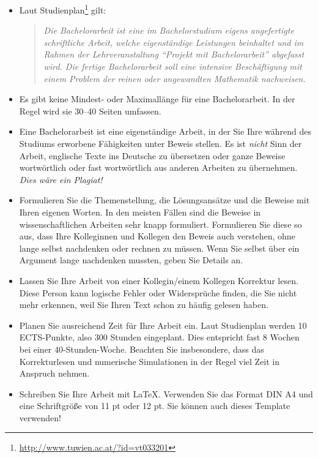 \documentclass[a4paper,11pt,bibliography=totoc,listof=totoc,headinclude=true,cleardoublepage=empty,oneside]{scrbook}
\begin{document}
{\color{change}
\begin{itemize}

\item Laut Studienplan\footnote{\href{http://www.tuwien.ac.at/?id=vt033201}{\ttfamily http://www.tuwien.ac.at/?id=vt033201}}
gilt:
\begin{quote}\itshape
Die Bachelorarbeit ist eine im Bachelorstudium eigens angefertigte schriftliche Arbeit, welche eigenständige Leistungen beinhaltet und im Rahmen der Lehrveranstaltung "`Projekt mit Bachelorarbeit"' abgefasst wird. Die fertige Bachelorarbeit soll eine intensive Beschäftigung mit einem Problem der reinen oder angewandten Mathematik nachweisen.
\end{quote}

\item Es gibt keine Mindest- oder Maximallänge für eine Bachelorarbeit. In der Regel wird sie 30--40 Seiten umfassen.

\item Eine Bachelorarbeit ist eine eigenständige Arbeit, in der Sie Ihre während
des Studiums erworbene Fähigkeiten unter Beweis stellen. Es ist {\em nicht}
Sinn der Arbeit, englische Texte ins Deutsche zu übersetzen oder ganze
Beweise wortwörtlich oder fast wortwörtlich 
aus anderen Arbeiten zu übernehmen. {\em Dies wäre ein Plagiat!} 

\item Formulieren Sie die Themenstellung, die Lösungsansätze und die Beweise 
mit Ihren eigenen Worten. In den meisten Fällen sind die Beweise
in wissenschaftlichen Arbeiten sehr knapp formuliert. Formulieren Sie diese so
aus, dass Ihre Kolleginnen und Kollegen den Beweis auch verstehen, ohne lange selbst nachdenken
oder rechnen zu müssen. Wenn Sie selbst über ein Argument lange nachdenken mussten,
geben Sie Details an.

\item Lassen Sie Ihre Arbeit von einer Kollegin/einem Kollegen Korrektur lesen.
Diese Person kann logische Fehler oder Widersprüche finden, die Sie nicht mehr
erkennen, weil Sie Ihren Text schon zu häufig gelesen haben.

\item Planen Sie ausreichend Zeit für Ihre Arbeit ein. Laut Studienplan
werden 10 ECTS-Punkte, also 300 Stunden eingeplant. Dies entspricht fast 
8 Wochen bei einer 40-Stunden-Woche. Beachten Sie insbesondere, dass das
Korrekturlesen und numerische Simulationen in der Regel viel Zeit in
Anspruch nehmen.

\item Schreiben Sie Ihre Arbeit mit \LaTeX. Verwenden Sie das Format DIN A4 und eine Schriftgröße von 11 pt
oder 12 pt. Sie können auch dieses Template verwenden!

\end{itemize}
}
\end{document}
